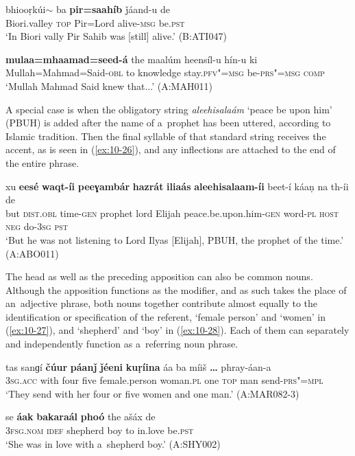 \begin{exe}
\ex
\label{ex:10-24}
\gll bhiooṛkúi$\sim$ ba \textbf{pir=saahíb} ǰáand-u de\\
Biori.valley \textsc{top} Pir=Lord alive-\textsc{msg} be.\textsc{pst}\\
\glt `In Biori vally Pir Sahib was [still] alive.' (B:ATI047)

\ex
\label{ex:10-25}
\gll \textbf{mulaa=mhaamad=seed-á} the maalúm heensíl-u hín-u ki\\
Mullah=Mahmad=Said-\textsc{obl} to knowledge stay.\textsc{pfv"=msg} be-\textsc{prs"=msg} \textsc{comp}\\
\glt `Mullah Mahmad Said knew that...' (A:MAH011)
\end{exe}

A special case is when the obligatory string \textit{aleehisalaám} `peace be upon him' (PBUH) is added after the name of a~prophet has been uttered, according to Islamic tradition. Then the final syllable of that standard string receives the accent, as is seen in (\ref{ex:10-26}), and any inflections are attached to the end of the entire phrase.

\begin{exe}
\ex
\label{ex:10-26}
\gll xu \textbf{eesé} \textbf{waqt-íi} \textbf{peeɣambár} \textbf{hazrát} \textbf{iliaás} \textbf{aleehisalaam-íi} beet-í káaṇ na th-íi de \\
but \textsc{dist.obl} time-\textsc{gen} prophet lord  Elijah peace.be.upon.him-\textsc{gen} 
word-\textsc{pl} \textsc{host} \textsc{neg} do-\textsc{3sg} \textsc{pst} \\
\glt `But he was not listening to Lord Ilyas [Elijah], PBUH, the prophet of the time.' (A:ABO011)
\end{exe}

The head as well as the preceding apposition can also be common nouns. Although the apposition functions as the modifier, and as such takes the place of an~adjective phrase, both nouns together contribute almost equally to the identification or specification of the referent, `female person' and `women' in (\ref{ex:10-27}), and `shepherd' and `boy' in (\ref{ex:10-28}). Each of them can separately and independently function as a~referring noun phrase. 
\begin{exe}
\ex
\label{ex:10-27}
\gll tas sanɡí \textbf{čúur} \textbf{páanǰ} \textbf{ǰéeni} \textbf{kuṛíina} áa ba míiš \textbf{{\ldots}} phray-áan-a\\
\textsc{3sg.acc} with four five female.person woman.\textsc{pl} one \textsc{top} man {} send-\textsc{prs"=mpl}\\
\glt `They send with her four or five women and one man.' (A:MAR082-3)

\ex
\label{ex:10-28}
\gll se \textbf{áak} \textbf{bakaraál} \textbf{phoó} the ašáx de  \\
\textsc{3fsg.nom} \textsc{idef} shepherd boy to in.love be.\textsc{pst}  \\
\glt `She was in love with a~shepherd boy.' (A:SHY002)
\end{exe}

